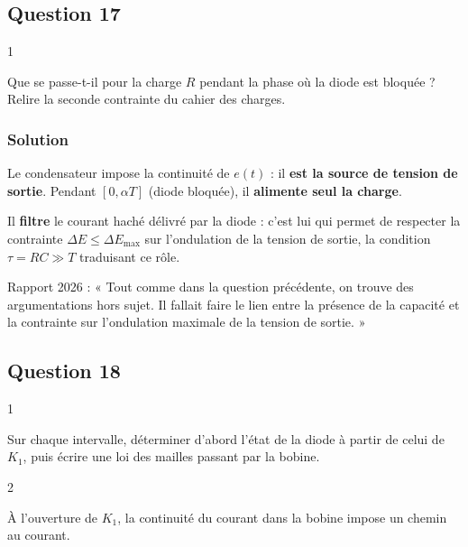 \documentclass[11pt,a4paper]{article}
\begin{document}
\hypertarget{question-17}{%
\subsection{Question 17}\label{question-17}}

\begin{indication}{1}

Que se passe-t-il pour la charge \(R\) pendant la phase où la diode est bloquée ? Relire la seconde contrainte du cahier des charges.

\end{indication}

\hypertarget{solution-16}{%
\subsubsection{Solution}\label{solution-16}}

Le condensateur impose la continuité de \(e(t)\) : il \textbf{est la source de tension de sortie}. Pendant \([0,\alpha T]\) (diode bloquée), il \textbf{alimente seul la charge}.

Il \textbf{filtre} le courant haché délivré par la diode : c'est lui qui permet de respecter la contrainte \(\Delta E\le\Delta E_{\max}\) sur l'ondulation de la tension de sortie, la condition \(\tau=RC\gg T\) traduisant ce rôle.

\begin{jury}

Rapport 2026 : « Tout comme dans la question précédente, on trouve des argumentations hors sujet. Il fallait faire le lien entre la présence de la capacité et la contrainte sur l'ondulation maximale de la tension de sortie. »

\end{jury}

\hypertarget{question-18}{%
\subsection{Question 18}\label{question-18}}

\begin{indication}{1}

Sur chaque intervalle, déterminer d'abord l'état de la diode à partir de celui de \(K_1\), puis écrire une loi des mailles passant par la bobine.

\end{indication}

\begin{indication}{2}

À l'ouverture de \(K_1\), la continuité du courant dans la bobine impose un chemin au courant.

\end{indication}
\end{document}
